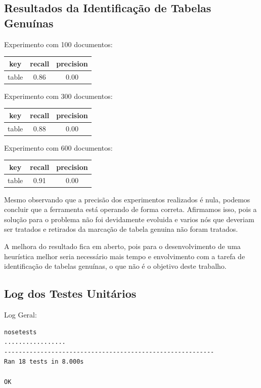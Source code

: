 \documentclass[12pt, a4paper]{article}
\begin{document}
\subsection{Resultados da Identificação de Tabelas Genuínas}
\label{ritg}

Experimento com 100 documentos:
\begin{center}
\begin{tabular}{| c | c | c |}
\hline key  & recall & precision\\
\hline table & 0.86 & 0.00\\
\hline
\end{tabular}
\end{center}

Experimento com 300 documentos:
\begin{center}
\begin{tabular}{| c | c | c |}
\hline key  & recall & precision\\
\hline table & 0.88 & 0.00\\
\hline
\end{tabular}
\end{center}

Experimento com 600 documentos:
\begin{center}
\begin{tabular}{| c | c | c |}
\hline key  & recall & precision\\
\hline table & 0.91 & 0.00\\
\hline
\end{tabular}
\end{center}

Mesmo observando que a precisão dos experimentos realizados é nula,
podemos concluir que a ferramenta está operando de forma correta.
Afirmamos isso, pois a solução para o problema não foi devidamente
evoluida e varios nós que deveriam ser tratados e retirados da marcação
de tabela genuina não foram tratados.

A melhora do resultado fica em aberto, pois para o desenvolvimento de uma
heurística melhor seria necessário mais tempo e envolvimento com a
tarefa de identificação de tabelas genuínas, o que não é o objetivo
deste trabalho.


\subsection{Log dos Testes Unitários}
\label{testes}

Log Geral:
\begin{verbatim}
nosetests
.................
----------------------------------------------------------
Ran 18 tests in 8.000s

OK

\end{verbatim}
\end{document}
